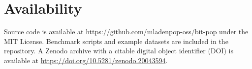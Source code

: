 \documentclass[utf8]{article}
\begin{document}
\section*{Availability}

Source code is available at \url{https://github.com/mladenpop-oss/bit-pop} under the MIT License. Benchmark scripts 
and example datasets are included in the repository. A Zenodo archive with a citable digital object identifier (DOI) 
is available at \url{https://doi.org/10.5281/zenodo.20043594}.



\end{document}
